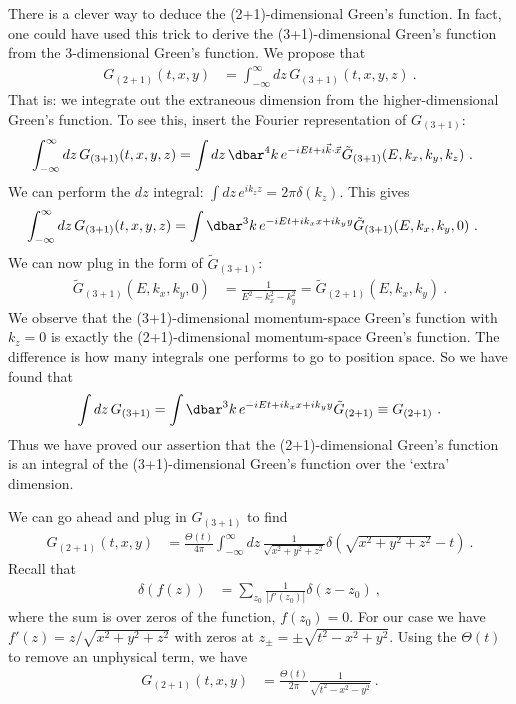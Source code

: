 There is a clever way to deduce the (2+1)-dimensional Green's function. In fact, one could have used this trick to derive the (3+1)-dimensional Green's function from the 3-dimensional Green's function. We propose that
\begin{align}
  G_{(2+1)}(t,x,y) &= \int_{-\infty}^\infty dz\, G_{(3+1)}(t,x,y,z) \ .
\end{align}
That is: we integrate out the extraneous dimension from the higher-dimensional Green's function. To see this, insert the Fourier representation of $G_{(3+1)}$:
\begin{align}
  \int_{-\infty}^\infty dz\, G_{(3+1)}(t,x,y,z)
  &=
  \int dz\,\dbar^4k\, e^{-iEt+i\vec{k}\cdot\vec{x}} \tilde G_{(3+1)}(E,k_x,k_y,k_z) \ .
\end{align}
We can perform the $dz$ integral: $\int dz \,e^{ik_zz} = 2\pi \delta(k_z)$. This gives
\begin{align}
  \int_{-\infty}^\infty dz\, G_{(3+1)}(t,x,y,z)
  &=
  \int \dbar^3k\, e^{-iEt+ik_xx+ik_yy} \tilde G_{(3+1)}(E,k_x,k_y,0) \ .
\end{align}
We can now plug in the form of $\tilde G_{(3+1)}$:
\begin{align}
  \tilde G_{(3+1)}(E,k_x,k_y,0) &=\frac{1}{E^2-k_x^2-k_y^2} = \tilde G_{(2+1)}(E,k_x,k_y) \ .
\end{align}
 We observe that the (3+1)-dimensional momentum-space Green's function with $k_z=0$ is exactly the (2+1)-dimensional momentum-space Green's function. The difference is how many integrals one performs to go to position space. So we have found that
\begin{align}
  \int dz\, G_{(3+1)} = \int \dbar^3k\, e^{-iEt+ik_xx +ik_y y} \tilde G_{(2+1)}
  \equiv G_{(2+1)} \ .
\end{align}
Thus we have proved our assertion that the (2+1)-dimensional Green's function is an integral of the (3+1)-dimensional Green's function over the `extra' dimension.

We can go ahead and plug in $G_{(3+1)}$ to find
\begin{align}
  G_{(2+1)}(t,x,y) 
  &= \frac{\Theta(t)}{4\pi}\int_{-\infty}^{\infty}dz\,
  \frac{1}{\sqrt{x^2+y^2 + z^2}}
  \delta(\sqrt{x^2+y^2+z^2}-t) \ .
\end{align}
Recall that
\begin{align}
  \delta(f(z)) &= \sum_{z_0} \frac{1}{|f'(z_0)|} \delta(z-z_0) \ ,
\end{align}
where the sum is over zeros of the function, $f(z_0)=0$. For our case we have $f'(z) = z/\sqrt{x^2+y^2+z^2}$ with zeros at $z_\pm = \pm \sqrt{t^2 - x^2+y^2}$. Using the $\Theta(t)$ to remove an unphysical term, we have
\begin{align}
  G_{(2+1)}(t,x,y) &= \frac{\Theta(t)}{2\pi} \frac{1}{\sqrt{t^2-x^2-y^2}} \ .
\end{align}


